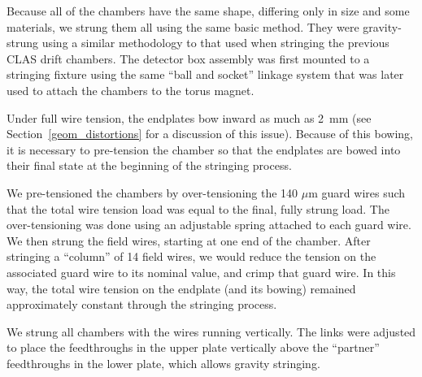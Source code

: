 Because all of the chambers have the same shape, differing only in
size and some materials, we strung them all using the same basic method.
They were gravity-strung using a similar methodology to that 
used when stringing the previous CLAS drift chambers.  The detector box 
assembly was first mounted to a stringing fixture using the same
``ball and socket'' linkage system that was later used to attach the
chambers to the torus magnet.  


Under full wire tension, the endplates bow inward as much as 2~mm 
(see Section~\ref{geom_distortions} for a discussion of this issue).
Because of this bowing, it is necessary to pre-tension the chamber
so that the endplates are bowed into their final state at the 
beginning of the stringing process.

We pre-tensioned the chambers by over-tensioning the 140 $\mu$m guard
wires such that the total wire tension load was equal to the final, 
fully strung load.  The over-tensioning was done using an adjustable
spring attached to each guard wire. 
We then strung the field wires, starting at one end of the chamber.
After stringing a ``column'' of 14 field wires, we would reduce the
tension on the associated guard wire to its nominal value, and crimp
that guard wire.  In this way, the total wire tension on the endplate
(and its bowing) remained approximately constant through the stringing process.

We strung all chambers with 
the wires running vertically.  The links were adjusted to place the 
feedthroughs in the upper plate vertically above the ``partner''
feedthroughs in the lower plate, which allows gravity stringing.


